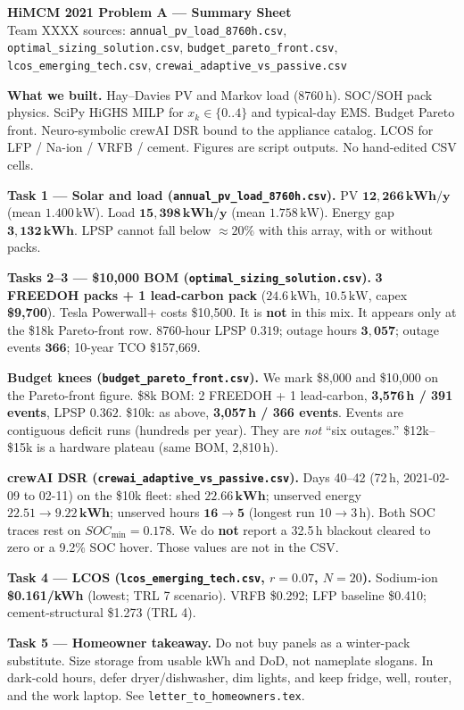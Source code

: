 \documentclass[11pt]{article}
\begin{document}
\begin{center}
{\Large\bfseries HiMCM 2021 Problem A --- Summary Sheet}\\[0.15em]
{\small Team XXXX \quad sources:
\texttt{annual\_pv\_load\_8760h.csv},
\texttt{optimal\_sizing\_solution.csv},
\texttt{budget\_pareto\_front.csv},
\texttt{lcos\_emerging\_tech.csv},
\texttt{crewai\_adaptive\_vs\_passive.csv}}
\end{center}
\vspace{0.3em}

\noindent\textbf{What we built.}
Hay--Davies PV and Markov load (8760\,h). SOC/SOH pack physics.
SciPy HiGHS MILP for \(x_k\in\{0..4\}\) and typical-day EMS. Budget
Pareto front. Neuro-symbolic crewAI DSR bound to the appliance catalog.
LCOS for LFP / Na-ion / VRFB / cement. Figures are script outputs. No
hand-edited CSV cells.

\medskip
\noindent\textbf{Task 1 --- Solar and load
(\texttt{annual\_pv\_load\_8760h.csv}).}
PV \(\mathbf{12{,}266\,kWh/y}\) (mean \(1.400\,\mathrm{kW}\)).
Load \(\mathbf{15{,}398\,kWh/y}\) (mean \(1.758\,\mathrm{kW}\)).
Energy gap \(\mathbf{3{,}132\,kWh}\). LPSP cannot fall below
\(\approx 20\%\) with this array, with or without packs.

\medskip
\noindent\textbf{Tasks 2--3 --- \$10{,}000 BOM
(\texttt{optimal\_sizing\_solution.csv}).}
\textbf{3 FREEDOH packs + 1 lead-carbon pack}
(\(24.6\,\mathrm{kWh}\), \(10.5\,\mathrm{kW}\), capex \textbf{\$9{,}700}).
Tesla Powerwall+ costs \$10{,}500. It is \textbf{not} in this mix.
It appears only at the \$18k Pareto-front row.
8760-hour LPSP \(\mathbf{0.319}\); outage hours \(\mathbf{3{,}057}\);
outage events \(\mathbf{366}\); 10-year TCO \$157{,}669.

\medskip
\noindent\textbf{Budget knees
(\texttt{budget\_pareto\_front.csv}).}
We mark \$8{,}000 and \$10{,}000 on the Pareto-front figure.
\$8k BOM: 2 FREEDOH + 1 lead-carbon, \textbf{3{,}576\,h / 391 events},
LPSP \(0.362\).
\$10k: as above, \textbf{3{,}057\,h / 366 events}.
Events are contiguous deficit runs (hundreds per year). They are
\emph{not} ``six outages.'' \$12k--\$15k is a hardware plateau (same BOM,
2{,}810\,h).

\medskip
\noindent\textbf{crewAI DSR
(\texttt{crewai\_adaptive\_vs\_passive.csv}).}
Days 40--42 (72\,h, 2021-02-09 to 02-11) on the \$10k fleet:
shed \(\mathbf{22.66\,kWh}\); unserved energy
\(\mathbf{22.51\to 9.22\,kWh}\); unserved hours \(\mathbf{16\to 5}\)
(longest run \(10\to 3\)\,h). Both SOC traces rest on
\(SOC_{\min}=\mathbf{0.178}\).
We do \textbf{not} report a 32.5\,h blackout cleared to zero or a
9.2\% SOC hover. Those values are not in the CSV.

\medskip
\noindent\textbf{Task 4 --- LCOS
(\texttt{lcos\_emerging\_tech.csv}, \(r=0.07\), \(N=20\)).}
Sodium-ion \textbf{\$0.161/kWh} (lowest; TRL 7 scenario).
VRFB \$0.292; LFP baseline \$0.410; cement-structural \$1.273 (TRL 4).

\medskip
\noindent\textbf{Task 5 --- Homeowner takeaway.}
Do not buy panels as a winter-pack substitute. Size storage from usable
kWh and DoD, not nameplate slogans. In dark-cold hours, defer
dryer/dishwasher, dim lights, and keep fridge, well, router, and the
work laptop. See \texttt{letter\_to\_homeowners.tex}.
\end{document}
